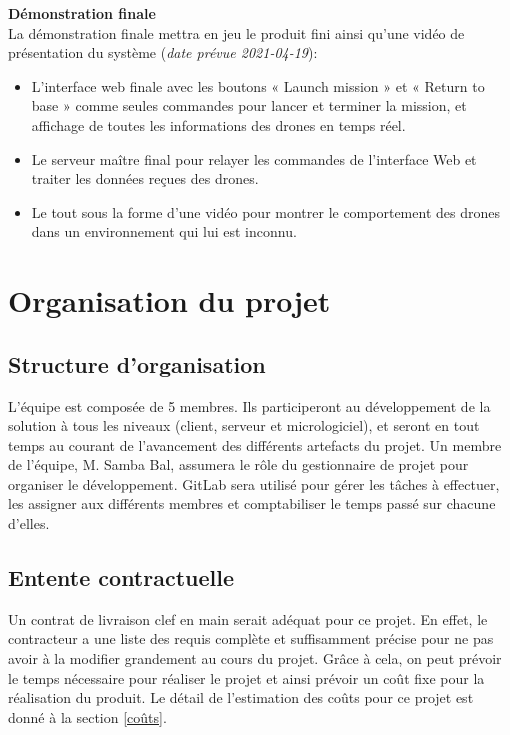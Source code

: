 \documentclass{mistcoursedoc}
\begin{document}
\textbf{Démonstration finale}\\
  La démonstration finale mettra en jeu le produit fini ainsi qu'une vidéo de présentation du système (\textit{date prévue 2021-04-19}):
        \begin{itemize}
          \item L'interface web finale avec les boutons « Launch mission » et « Return to base » comme seules commandes pour lancer et terminer la mission, et affichage de toutes les informations des drones en temps réel.
          \item Le serveur maître final pour relayer les commandes de l'interface Web et traiter les données reçues des drones.
          \item Le tout sous la forme d'une vidéo pour montrer le comportement des drones dans un environnement qui lui est inconnu.
        \end{itemize}

\section{Organisation du projet}

\subsection{Structure d’organisation}

L’équipe est composée de 5 membres. Ils participeront au développement de la solution à tous les niveaux (client, serveur et micrologiciel), et seront en tout temps au courant de l’avancement des différents artefacts du projet. Un membre de l'équipe, M. Samba Bal, assumera le rôle du gestionnaire de projet pour organiser le développement. GitLab sera utilisé pour gérer les tâches à effectuer, les assigner aux différents membres et comptabiliser le temps passé sur chacune d’elles.

\subsection{Entente contractuelle}

Un contrat de livraison clef en main serait adéquat pour ce projet. En effet, le contracteur a une liste des requis complète et suffisamment précise pour ne pas avoir à la modifier grandement au cours du projet.
Grâce à cela, on peut prévoir le temps nécessaire pour réaliser le projet et ainsi prévoir un coût fixe pour la réalisation du produit. Le détail de l'estimation des coûts pour ce projet est donné à la section \ref{coûts}.
\end{document}
